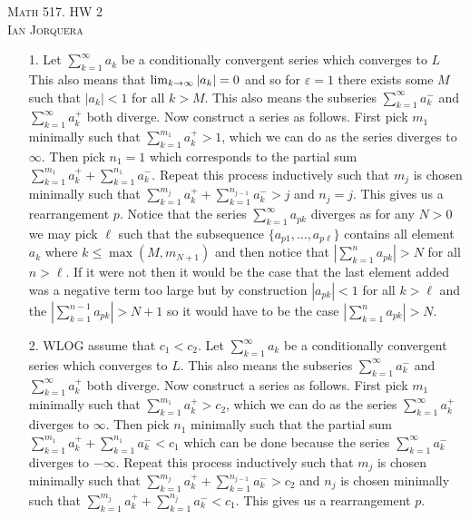 \documentclass[12pt]{amsart}
\begin{document}
\begin{center}
    \textsc{Math 517. HW 2\\ Ian Jorquera}
\end{center}
\vspace{1em}

\begin{itemize}
    \item[1.] Let $\sum_{k=1}^{\infty}{a_k}$ be a conditionally convergent series which
        converges to $L$ This also means that $\lim_{k\rightarrow\infty}|a_k|=0$ and so for
        $\varepsilon=1$ there exists some $M$ such that $|a_k|<1$ for all $k>M$. This
        also means the subseries $\sum_{k=1}^{\infty}{a^-_k}$ and
        $\sum_{k=1}^{\infty}{a^+_k}$ both diverge. Now construct a series as follows.
        First pick $m_1$ minimally such that $\sum_{k=1}^{m_1}{a^+_k}> 1$, which we can
        do as the series diverges to $\infty$. Then pick $n_1=1$ which corresponds to
        the partial sum $\sum_{k=1}^{m_1}{a^+_k}+\sum_{k=1}^{n_1}{a^-_k}$. Repeat this
        process inductively such that $m_j$ is chosen minimally such that
        $\sum_{k=1}^{m_j}{a^+_k}+\sum_{k=1}^{n_{j-1}}{a^-_k}> j$ and $n_j=j$. This
        gives us a rearrangement $p$. Notice that the series
        $\sum_{k=1}^{\infty}{a_{pk}}$ diverges as for any $N>0$ we may pick $\ell$ such
        that the subsequence $\{a_{p1},\dots,a_{p\ell}\}$ contains all element $a_k$
        where $k\leq\max{(M, m_{N+1})}$ and then notice that
        $|\sum_{k=1}^{n}{a_{pk}}|>N$ for all $n>\ell$. If it were not then it would be
        the case that the last element added was a negative term too large but by
        construction $|a_{pk}|<1$ for all $k>\ell$ and the
        $|\sum_{k=1}^{n-1}{a_{pk}}|>N+1$ so it would have to be the case
        $|\sum_{k=1}^{n}{a_{pk}}|>N$.

    \item[2.] %
        WLOG assume that $c_1<c_2$. Let $\sum_{k=1}^{\infty}{a_k}$ be a conditionally
        convergent series which converges to $L$. This also means the subseries
        $\sum_{k=1}^{\infty}{a^-_k}$ and $\sum_{k=1}^{\infty}{a^+_k}$ both diverge. Now
        construct a series as follows. First pick $m_1$ minimally such that
        $\sum_{k=1}^{m_1}{a^+_k}> c_2$, which we can do as the series
        $\sum_{k=1}^{\infty}{a^+_k}$ diverges to $\infty$. Then pick $n_1$ minimally
        such that the partial sum $\sum_{k=1}^{m_1}{a^+_k}+\sum_{k=1}^{n_1}{a^-_k}<c_1$
        which can be done because the series $\sum_{k=1}^{\infty}{a^-_k}$ diverges to
        $-\infty$. Repeat this process inductively such that $m_j$ is chosen minimally
        such that $\sum_{k=1}^{m_j}{a^+_k}+\sum_{k=1}^{n_{j-1}}{a^-_k}> c_2$ and $n_j$
        is chosen minimally such that
        $\sum_{k=1}^{m_j}{a^+_k}+\sum_{k=1}^{n_{j}}{a^-_k}< c_1$. This gives us a
        rearrangement $p$.


\end{itemize}
\end{document}
